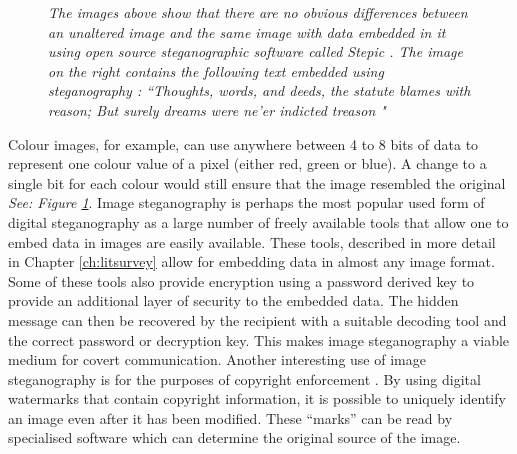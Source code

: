 \begin{figure}[h!]
\caption{\emph{The images above show that there are no obvious differences between an unaltered image and the same image with data embedded in it using open source steganographic software called Stepic \cite{stepnic}. The image on the right contains the following text embedded using steganography : ``Thoughts, words, and deeds, the statute blames with reason;  But surely dreams were ne'er indicted treason \cite{burns}"}}
\label{fig:stegexample}
\end{figure} 
Colour images, for example, can use anywhere between 4 to 8 bits of data to represent one colour value of a pixel (either red, green or blue). A change to a single bit for each colour would still ensure that the image resembled the original \emph{See: Figure \ref{fig:stegexample}}.
Image steganography is perhaps the most popular used form of digital steganography as a large number of freely available tools that allow one to embed data in images are easily available. These tools, described in more detail in Chapter \ref{ch:litsurvey} allow for embedding data in almost any image format. Some of these tools also provide encryption using a password derived key to provide an additional layer of security to the embedded data. The hidden message can then be recovered by the recipient with a suitable decoding tool and the correct password or decryption key. This makes image steganography a viable medium for covert communication.  
Another interesting use of image steganography is for the purposes of copyright enforcement  \cite{kundur2002digital}. By using digital watermarks that contain copyright information,  it is possible to uniquely identify an image even after it has  been modified. These ``marks'' can be read by specialised software which can determine the original source of the image. 
